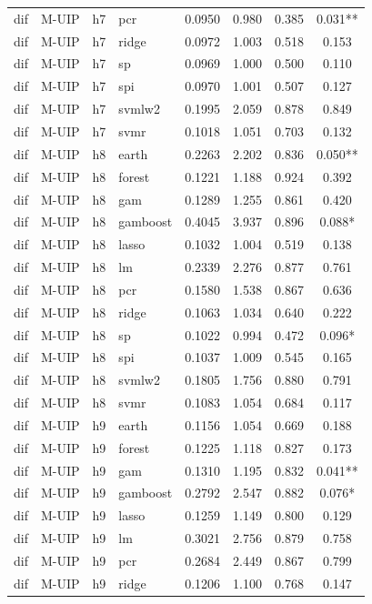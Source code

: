 \begin{ThreePartTable}
\begin{longtable}[t]{llclcccc}
dif & M-UIP & h7 & pcr & 0.0950 & 0.980 & 0.385 & 0.031**\\
dif & M-UIP & h7 & ridge & 0.0972 & 1.003 & 0.518 & 0.153\\
dif & M-UIP & h7 & sp & 0.0969 & 1.000 & 0.500 & 0.110\\
dif & M-UIP & h7 & spi & 0.0970 & 1.001 & 0.507 & 0.127\\
dif & M-UIP & h7 & svmlw2 & 0.1995 & 2.059 & 0.878 & 0.849\\
dif & M-UIP & h7 & svmr & 0.1018 & 1.051 & 0.703 & 0.132\\
\addlinespace
dif & M-UIP & h8 & earth & 0.2263 & 2.202 & 0.836 & 0.050**\\
dif & M-UIP & h8 & forest & 0.1221 & 1.188 & 0.924 & 0.392\\
dif & M-UIP & h8 & gam & 0.1289 & 1.255 & 0.861 & 0.420\\
dif & M-UIP & h8 & gamboost & 0.4045 & 3.937 & 0.896 & 0.088*\\
dif & M-UIP & h8 & lasso & 0.1032 & 1.004 & 0.519 & 0.138\\
dif & M-UIP & h8 & lm & 0.2339 & 2.276 & 0.877 & 0.761\\
dif & M-UIP & h8 & pcr & 0.1580 & 1.538 & 0.867 & 0.636\\
dif & M-UIP & h8 & ridge & 0.1063 & 1.034 & 0.640 & 0.222\\
dif & M-UIP & h8 & sp & 0.1022 & 0.994 & 0.472 & 0.096*\\
dif & M-UIP & h8 & spi & 0.1037 & 1.009 & 0.545 & 0.165\\
dif & M-UIP & h8 & svmlw2 & 0.1805 & 1.756 & 0.880 & 0.791\\
dif & M-UIP & h8 & svmr & 0.1083 & 1.054 & 0.684 & 0.117\\
\addlinespace
dif & M-UIP & h9 & earth & 0.1156 & 1.054 & 0.669 & 0.188\\
dif & M-UIP & h9 & forest & 0.1225 & 1.118 & 0.827 & 0.173\\
dif & M-UIP & h9 & gam & 0.1310 & 1.195 & 0.832 & 0.041**\\
dif & M-UIP & h9 & gamboost & 0.2792 & 2.547 & 0.882 & 0.076*\\
dif & M-UIP & h9 & lasso & 0.1259 & 1.149 & 0.800 & 0.129\\
dif & M-UIP & h9 & lm & 0.3021 & 2.756 & 0.879 & 0.758\\
dif & M-UIP & h9 & pcr & 0.2684 & 2.449 & 0.867 & 0.799\\
dif & M-UIP & h9 & ridge & 0.1206 & 1.100 & 0.768 & 0.147\\

\end{longtable}
\end{ThreePartTable}
